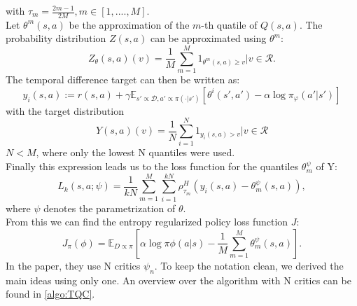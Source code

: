 with ${\tau_m = \frac{2m-1}{2M}}, m \in [1, ...., M]$.\\
Let $\theta^m(s,a)$ be the approximation of the $m$-th quatile of $Q(s,a)$. The probability distribution $Z(s,a)$ can be approximated using $\theta^m$:
\begin{equation}
    Z_{\theta}(s,a) (v) = \frac{1}{M} \sum_{m=1}^M 1_{\theta^m(s,a) \geq v} | v\in\mathcal{R}.
\end{equation}
The temporal difference target can then be written as:
\begin{equation}
    y_i(s,a) := r(s,a) + \gamma \mathbb{E}_{s' \propto \mathcal{D}, a' \propto \pi(\cdot|s')}[\theta^i(s',a') - \alpha \log \pi_{\varphi}(a'|s')]
\end{equation}
with the target distribution
\begin{equation}
    Y(s,a)(v) = \frac{1}{N} \sum_{i=1}^N 1_{y_i(s,a) > v} | v \in \mathcal{R}
\end{equation}
$N<M$, where only the lowest N quantiles were used. \\
Finally this expression leads us to the loss function for the quantiles $\theta_m^{\psi}$ of Y:
\begin{equation}
    L_k(s,a;\psi) = \frac{1}{kN}\sum_{m=1}^{M}\sum_{i=1}^{kN}\rho^H_{\tau_m} \left(y_i(s,a) - \theta_m^{\psi}(s,a)\right),
\end{equation}
where $\psi$ denotes the parametrization of $\theta$.\\
From this we can find the entropy regularized policy loss function $J$:
\begin{equation}
    J_\pi(\phi) = \mathbb{E}_{D \propto \pi}\left[\alpha\log\pi{\phi}(a|s) - \frac{1}{M}\sum_{m=1}^{M}\theta_m^{\psi}(s,a)\right].
\end{equation}
In the paper, they use N critics $\psi_n$. To keep the notation clean, we derived the main ideas using only one. An 
overview over the algorithm with N critics can be found in \ref{algo:TQC}.

